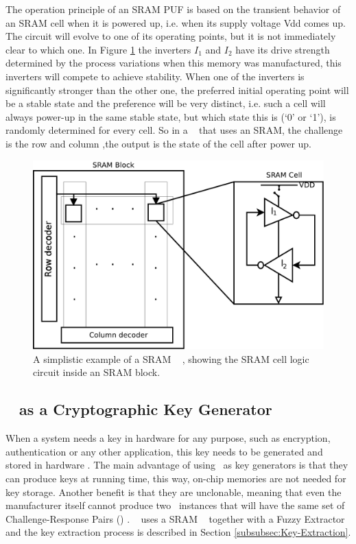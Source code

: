 The operation principle of an SRAM PUF is based on the transient behavior of an SRAM cell when it is powered up, i.e. when its supply voltage Vdd comes up. The circuit will evolve to one of its operating points, but it is not immediately clear to which one. In Figure   \ref{fig:spufexample} the inverters $I_1$ and $I_2$ have its drive strength determined by the process variations when this memory was manufactured, this inverters will compete to achieve stability. When one of the inverters is significantly stronger than the other one, the preferred initial operating point will be a stable state and the preference will be very distinct, i.e. such a cell will always power-up in the same stable state, but which state this is (‘0’ or ‘1’), is randomly determined for every cell.
So in a \puf~ that uses an SRAM, the challenge is the row and column ,the output is the state of the cell after power up.
\begin{figure}[!ht]
	\centering
	\includegraphics[scale=0.42]{figures/pdf/spuf}
	\caption{A simplistic example of a SRAM \puf~ , showing the SRAM cell logic circuit inside an SRAM block.}
	\label{fig:spufexample}
\end{figure}


\subsection{\puf~ as a Cryptographic  Key Generator }
When a system needs a key in hardware for any purpose, such as encryption, authentication or any other application, this key needs to be generated  and stored in hardware \cite{puf-key-devadas-1278484}. The main advantage of using \pufs~as key generators is that they can produce keys at running time, this way, on-chip memories are not needed for key storage. Another benefit is that they are unclonable, meaning that even the manufacturer itself cannot produce two \puf~instances that will have the same set of Challenge-Response Pairs (\crps) \cite{Gassend2002:PUFs}.
\cshia~ uses a SRAM \puf~ together with a Fuzzy Extractor and the key extraction process is described in Section \ref{subsubsec:Key-Extraction}.


